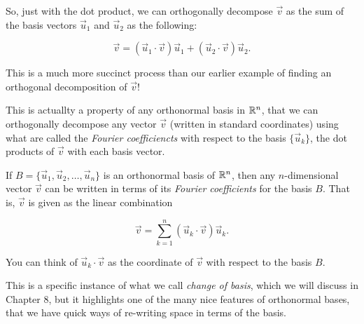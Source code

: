 \documentclass{ximera}
\begin{document}
  So, just with the dot product, we can orthogonally decompose $\vec{v}$ as the sum of the basis vectors $\vec{u}_1$ and $\vec{u}_2$ as the following:

  $$\vec{v}=\left(\vec{u}_1\cdot\vec{v}\right)\vec{u}_1+\left(\vec{u}_2\cdot\vec{v}\right)\vec{u}_2.$$

  This is a much more succinct process than our earlier example of finding an orthogonal decomposition of $\vec{v}$!

  This is actuallty a property of any orthonormal basis in $\mathbb{R}^n$, that we can orthogonally decompose any vector $\vec{v}$ (written in standard coordinates) using what are called the \emph{Fourier coefficiencts} with respect to the basis $\lbrace \vec{u}_k\rbrace$, the dot products of $\vec{v}$ with each basis vector.

  \begin{theorem}
   If $B=\lbrace \vec{u}_1, \vec{u}_2, \ldots, \vec{u}_n\rbrace$ is an orthonormal basis of $\mathbb{R}^n$, then any $n$-dimensional vector $\vec{v}$ can be written in terms of its \emph{Fourier coefficients} for the basis $B$. That is, $\vec{v}$ is given as the linear combination 

   $$\vec{v}=\sum_{k=1}^n\left(\vec{u}_k\cdot\vec{v}\right)\vec{u}_k.$$

   You can think of $\vec{u}_k\cdot\vec{v}$ as the coordinate of $\vec{v}$ with respect to the basis $B$. 
  \end{theorem}

  This is a specific instance of what we call \emph{change of basis}, which we will discuss in Chapter 8, but it highlights one of the many nice features of orthonormal bases, that we have quick ways of re-writing space in terms of the basis.
\end{document}
